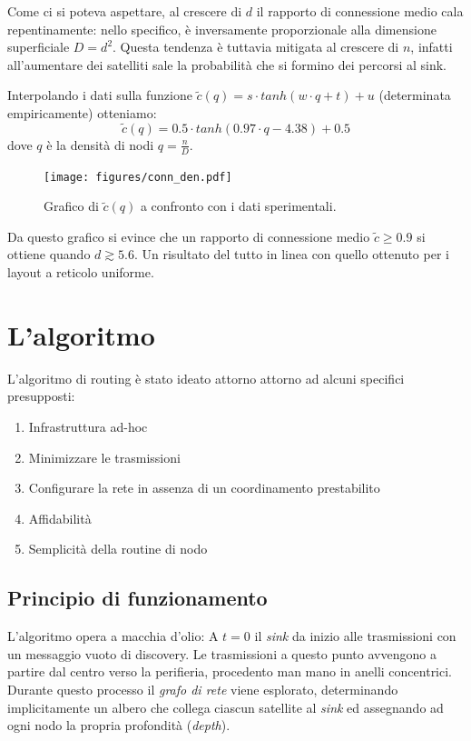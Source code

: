\documentclass[a4paper,12pt]{article}
\theoremstyle{definition}
\begin{document}
Come ci si poteva aspettare, al crescere di $d$ il rapporto di connessione medio cala repentinamente: nello specifico, è inversamente proporzionale alla dimensione superficiale $D = d^2$. Questa tendenza è tuttavia mitigata al crescere di $n$, infatti all'aumentare dei satelliti sale la probabilità che si formino dei percorsi al sink.

Interpolando i dati sulla funzione $\tilde{c}(q) = s \cdot tanh(w \cdot q + t) + u$ (determinata empiricamente) otteniamo:
\begin{equation*}
\tilde{c}(q) = 0.5 \cdot tanh(0.97 \cdot q - 4.38) + 0.5
\end{equation*}
dove $q$ è la densità di nodi $q = \frac{n}{D}$.

\begin{figure}[H]
\centering
\texttt{[image: figures/conn\_den.pdf]}
\caption{Grafico di $\tilde{c}(q)$ a confronto con i dati sperimentali.}
\end{figure}

Da questo grafico si evince che un rapporto di connessione medio $\tilde{c} \geq 0.9$ si ottiene quando $d \gtrsim 5.6$. Un risultato del tutto in linea con quello ottenuto per i layout a reticolo uniforme.

\section{L'algoritmo}

L'algoritmo di routing è stato ideato attorno attorno ad alcuni specifici presupposti:

\begin{enumerate}
\item Infrastruttura ad-hoc
\item Minimizzare le trasmissioni
\item Configurare la rete in assenza di un coordinamento prestabilito
\item Affidabilità
\item Semplicità della routine di nodo
\end{enumerate}

\subsection{Principio di funzionamento}

L'algoritmo opera a macchia d'olio: A $t=0$ il \emph{sink} da inizio alle trasmissioni con un messaggio vuoto di discovery. Le trasmissioni a questo punto avvengono a partire dal centro verso la perifieria, procedento man mano in anelli concentrici. Durante questo processo il \emph{grafo di rete} viene esplorato, determinando implicitamente un albero che collega ciascun satellite al \emph{sink} ed assegnando ad ogni nodo la propria profondità (\emph{depth}).
\end{document}
